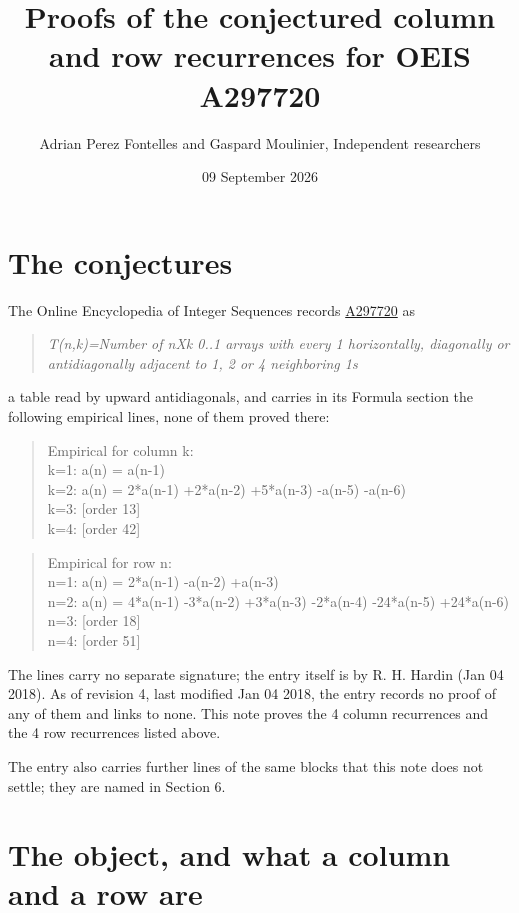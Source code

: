 \documentclass[11pt]{article}
\title{Proofs of the conjectured column and row recurrences for OEIS A297720}
\author{Adrian Perez Fontelles and Gaspard Moulinier, Independent researchers}
\date{09 September 2026}
\theoremstyle{definition}
\begin{document}
\maketitle
\section{The conjectures}

The Online Encyclopedia of Integer Sequences records \href{https://oeis.org/A297720}{A297720} as

\begin{quote}\itshape T(n,k)=Number of nXk 0..1 arrays with every 1 horizontally, diagonally or antidiagonally adjacent to 1, 2 or 4 neighboring 1s\end{quote}

a table read by upward antidiagonals, and carries in its Formula section the following empirical lines, none of them proved there:

\begin{quote}\ttfamily Empirical for column k:\\
k=1: a(n) = a(n-1)\\k=2: a(n) = 2*a(n-1) +2*a(n-2) +5*a(n-3) -a(n-5) -a(n-6)\\k=3: [order 13]\\k=4: [order 42]\end{quote}

\begin{quote}\ttfamily Empirical for row n:\\
n=1: a(n) = 2*a(n-1) -a(n-2) +a(n-3)\\n=2: a(n) = 4*a(n-1) -3*a(n-2) +3*a(n-3) -2*a(n-4) -24*a(n-5) +24*a(n-6)\\n=3: [order 18]\\n=4: [order 51]\end{quote}

The lines carry no separate signature; the entry itself is by R. H. Hardin (Jan 04 2018). As of revision 4, last modified Jan 04 2018, the entry records no proof of any of them and links to none. This note proves the 4 column recurrences and the 4 row recurrences listed above.

The entry also carries further lines of the same blocks that this note does not settle; they are named in Section 6.

\section{The object, and what a column and a row are}
\end{document}
